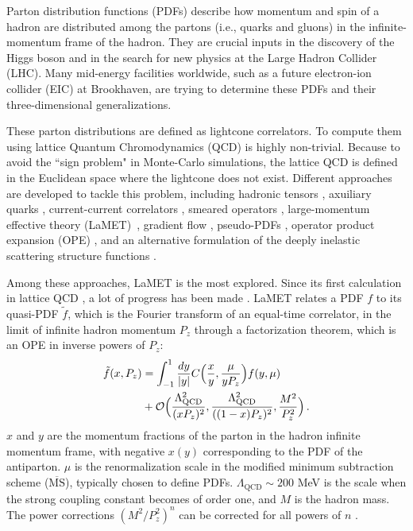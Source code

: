 \documentclass[aps,prd,twocolumn,tightenlines,superscriptaddress,
nofootinbib,preprintnumbers]{revtex4-1}
\begin{document}
Parton distribution functions (PDFs) describe how momentum and spin of a hadron are distributed among the partons (i.e., quarks and gluons) in the infinite-momentum frame of the hadron.
They are crucial inputs in the discovery of the Higgs boson and in the search for new physics at the Large Hadron Collider (LHC). Many mid-energy facilities worldwide, such as a future electron-ion collider (EIC) \cite{
AbdulKhalek:2022hcn}
at Brookhaven, are trying to determine these PDFs and their three-dimensional generalizations. 

These parton distributions are defined as lightcone correlators. To compute them using lattice Quantum Chromodynamics (QCD) is highly non-trivial. Because to avoid the ``sign problem" in Monte-Carlo simulations, the lattice QCD is defined in the Euclidean space where the lightcone does not exist. Different approaches are developed to tackle this problem, including hadronic tensors \cite{Liu:1993cv}, axuiliary quarks \cite{Detmold:2005gg},  
 current-current correlators \cite{Braun:2007wv,Ma:2017pxb}, smeared operators \cite{Davoudi:2012ya}, large-momentum effective theory (LaMET)~\cite{Ji:2013dva,Ji:2014gla}, gradient flow \cite{Monahan:2015lha,Shindler:2023xpd},
 pseudo-PDFs \cite{Radyushkin:2017cyf},
operator product expansion (OPE) \cite{Chambers:2017dov}, and an alternative formulation of the deeply inelastic scattering structure functions \cite{Mueller:2019qqj}.

Among these approaches, LaMET
is the most explored. Since its first calculation in lattice QCD \cite{Lin:2014zya}, a lot of progress has been made \cite{Ji:2020ect}. LaMET relates
a PDF $f$ to its quasi-PDF $\tilde f$, which is the Fourier transform of an equal-time correlator, in the limit of infinite hadron momentum $P_z$ through a factorization theorem, which is an OPE in inverse powers of $P_z$:
\begin{align}\label{eq:lamet2}
    \tilde f(x,P_z) &=  \int_{-1}^1 {dy\over |y|} C\Big({x\over y}, {\mu \over y P_z}\Big)  f(y,\mu) \nonumber\\
    & + {\cal O}\Big( {\Lambda_{\mathrm{QCD}}^2\over (xP_z)^2}, {\Lambda_{\mathrm{QCD}}^2\over ((1-x)P_z)^2},\frac{M^2}{P_z^2}\Big)\,.
\end{align}
$x$ and $y$ are the momentum fractions of the parton in the hadron infinite momentum frame, with negative $x(y)$ corresponding to the PDF of the antiparton. $\mu$ is the renormalization scale in the modified minimum subtraction scheme ($\overline{\text{MS}}$), typically chosen to define PDFs. $\Lambda_{\mathrm{QCD}}\sim 200$ MeV is the scale when the strong coupling constant becomes of order one, and $M$ is the hadron mass. The power corrections $(M^2/P_z^2)^n$ can be corrected for all powers of $n$ \cite{Chen:2016utp}. 
\end{document}
